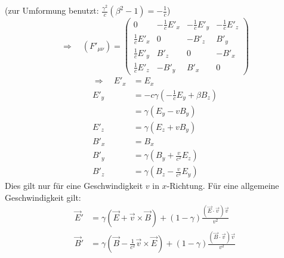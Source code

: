 (zur Umformung benutzt: $ \frac{\gamma^2}{c} (\beta^2 - 1) = - \frac{1}{c} $)
\begin{equation*}
\Rightarrow \quad (F'_{\mu \nu}) = \begin{pmatrix}
0 & - \frac{1}{c} E'_x & - \frac{1}{c} E'_y & - \frac{1}{c} E'_z \\[10pt]
\frac{1}{c} E'_x & 0 & - B'_z & B'_y \\[10pt]
\frac{1}{c} E'_y & B'_z & 0 & - B'_x \\[10pt]
\frac{1}{c} E'_z & - B'_y & B'_x & 0
\end{pmatrix}
\end{equation*}
\begin{align*}
\Rightarrow \quad E'_x &= E_x \\[5pt]
E'_y &= - c \gamma (- \frac{1}{c} E_y + \beta B_z) \\
&= \gamma (E_y - v B_y) \\[5pt]
E'_z &= \gamma (E_z + v B_y) \\[10pt]
B'_x &= B_x \\
B'_y &= \gamma (B_y + \frac{v}{c^2} E_z) \\
B'_z &= \gamma (B_z - \frac{v}{c^2} E_y)
\end{align*}
Dies gilt nur für eine Geschwindigkeit $ v $ in $ x $-Richtung. Für eine allgemeine Geschwindigkeit gilt:
\begin{align*}
\vec{E}' &= \gamma (\vec{E} + \vec{v} \times \vec{B}) + (1 - \gamma) \frac{(\vec{E} \cdot \vec{v}) \vec{v}}{v^2} \\
\vec{B}' &= \gamma (\vec{B} - \frac{1}{c^2} \vec{v} \times \vec{E}) + (1 - \gamma) \frac{(\vec{B} \cdot \vec{v}) \vec{v}}{v^2}
\end{align*}
%
%
%
%

